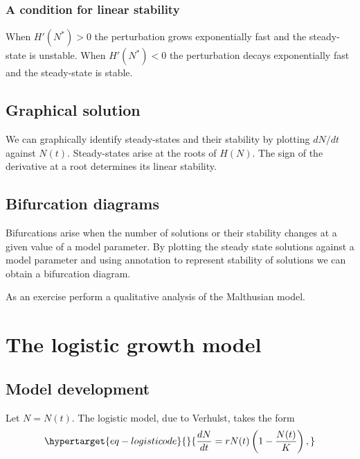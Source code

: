 \documentclass[
  letterpaper,
  DIV=11,
  numbers=noendperiod]{scrreprt}
\begin{document}
\hypertarget{a-condition-for-linear-stability}{%
\subsubsection{A condition for linear
stability}\label{a-condition-for-linear-stability}}

When \(H'(N^*)>0\) the perturbation grows exponentially fast and the
steady-state is unstable. When \(H'(N^*)<0\) the perturbation decays
exponentially fast and the steady-state is stable.

\hypertarget{graphical-solution}{%
\subsection{Graphical solution}\label{graphical-solution}}

We can graphically identify steady-states and their stability by
plotting \(dN/dt\) against \(N(t)\). Steady-states arise at the roots of
\(H(N)\). The sign of the derivative at a root determines its linear
stability.

\hypertarget{bifurcation-diagrams-1}{%
\subsection{Bifurcation diagrams}\label{bifurcation-diagrams-1}}

Bifurcations arise when the number of solutions or their stability
changes at a given value of a model parameter. By plotting the steady
state solutions against a model parameter and using annotation to
represent stability of solutions we can obtain a bifurcation diagram.

As an exercise perform a qualitative analysis of the Malthusian model.

\hypertarget{the-logistic-growth-model}{%
\section{The logistic growth model}\label{the-logistic-growth-model}}

\hypertarget{model-development-1}{%
\subsection{Model development}\label{model-development-1}}

Let \(N=N(t)\). The logistic model, due to Verhulst, takes the form
\begin{equation}\protect\hypertarget{eq-logisticode}{}{
\frac{dN}{dt}=rN(t)\left (1-\frac{N(t)}{K}\right),
}\label{eq-logisticode}\end{equation}
\end{document}
